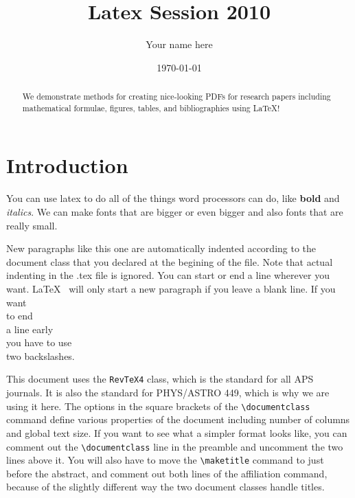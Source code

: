 \documentclass[twocolumn,10 pt,showpacs,preprintnumbers,amsmath,amssymb]{revtex4-1}
\begin{document}
\title{Latex Session 2010}

\author{Your name here}

\date{\today}

\begin{abstract}
  We demonstrate methods for creating nice-looking PDFs for research
  papers including mathematical formulae, figures, tables, and
  bibliographies using \LaTeX !
\end{abstract}

\maketitle

\section{Introduction}

You can use latex to do all of the things word processors can do, like
\textbf{bold} and \textit{italics}.  We can make fonts that are {\Large
bigger} or even {\Huge bigger} and also fonts that are really {\tiny 
small}.

New paragraphs like this one are automatically indented according to the
document class that you declared at the begining of the file.  Note that
actual indenting in the .tex file is ignored.  You can start or end a
line wherever you want.  \LaTeX~ will only start a new paragraph if you
leave a blank line.  If you want\\ to end\\ a line early\\ you have to
use\\ two backslashes.

This document uses the \texttt{Rev\TeX 4} class, which is the standard for
all APS journals. It is also the standard for PHYS/ASTRO 449, which is
why we are using it here. The options in the square brackets of the
\verb_\documentclass_ command define various properties of the document
including number of columns and global text size. If you want to see
what a simpler format looks like, you can comment out the
\verb_\documentclass_ line in the preamble and uncomment the two lines
above it. You will also have to move the \verb_\maketitle_ command to
just before the abstract, and comment out both lines of the affiliation
command, because of the slightly different way the two document classes
handle titles.
\end{document}
